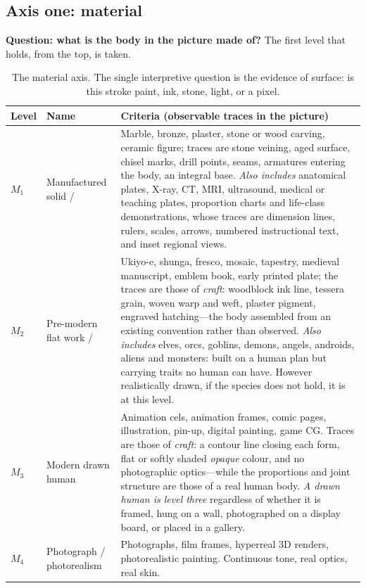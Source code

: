 \documentclass[11pt]{article}
\newcommand{\axm}{M}
\begin{document}
\subsection{Axis one: material}
\label{sec:material}

\textbf{Question: what is the body in the picture made of?} The first level
that holds, from the top, is taken.

\begin{table}[t]
\centering\small
\begin{tabularx}{\textwidth}{@{}llX@{}}
\toprule
Level & Name & Criteria (observable traces in the picture) \\
\midrule
$\axm_1$ & Manufactured solid / &
Marble, bronze, plaster, stone or wood carving, ceramic figure; traces are
stone veining, aged surface, chisel marks, drill points, seams, armatures
entering the body, an integral base. \emph{Also includes} anatomical plates,
X-ray, CT, MRI, ultrasound, medical or teaching plates, proportion charts and
life-class demonstrations, whose traces are dimension lines, rulers, scales,
arrows, numbered instructional text, and inset regional views. \\
$\axm_2$ & Pre-modern flat work / &
Ukiyo-e, shunga, fresco, mosaic, tapestry, medieval manuscript, emblem book,
early printed plate; the traces are those of \emph{craft}: woodblock ink line,
tessera grain, woven warp and weft, plaster pigment, engraved hatching---the
body assembled from an existing convention rather than observed. \emph{Also
includes} elves, orcs, goblins, demons, angels, androids, aliens and monsters:
built on a human plan but carrying traits no human can have. However
realistically drawn, if the species does not hold, it is at this level. \\
$\axm_3$ & Modern drawn human &
Animation cels, animation frames, comic pages, illustration, pin-up, digital
painting, game CG. Traces are those of \emph{craft}: a contour line closing
each form, flat or softly shaded \emph{opaque} colour, and no photographic
optics---while the proportions and joint structure are those of a real human
body. \emph{A drawn human is level three} regardless of whether it is framed,
hung on a wall, photographed on a display board, or placed in a gallery. \\
$\axm_4$ & Photograph / photorealism &
Photographs, film frames, hyperreal 3D renders, photorealistic painting.
Continuous tone, real optics, real skin. \\
\bottomrule
\end{tabularx}
\caption{The material axis. The single interpretive question is the evidence of
surface: is this stroke paint, ink, stone, light, or a pixel.}
\label{tab:material}
\end{table}
\end{document}
